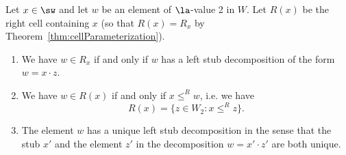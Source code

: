 \begin{thm}
    \label{thm:CellViaDecomp}
    Let $x\in \sw$ and let $w$ be an element of $\la$-value 2 in $W$. Let $R(x)$ be the right cell containing $x$
    \textup{(}so that $R(x)=R_x$ by Theorem~\ref{thm:cellParameterization}\textup{)}.
    \begin{enumerate}
        \item We have  $w\in R_x$ if and only if $w$ has a left stub decomposition of the form $w=x\cdot z$.
        \item We have $w\in R(x)$ if and only if $x\le^R w$, i.e. we have 
        \[
            R(x)=\{z\in W_2: x\le^R z\}.
        \]
        \item The element $w$ has a unique left stub decomposition in the sense that the stub $x'$ and the
             element  $z'$ in the decomposition $w=x'\cdot z'$ are both unique.
    \end{enumerate}
\end{thm}
